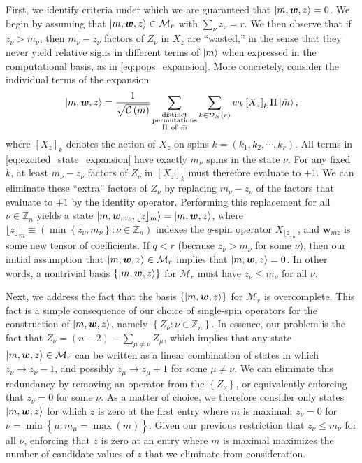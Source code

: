 \documentclass[nofootinbib,notitlepage,11pt]{revtex4-2}
\renewcommand{\t}{\text} %
\newcommand{\f}[2]{\dfrac{#1}{#2}} %
\newcommand{\p}[1]{\left(#1\right)} %
\renewcommand{\sp}[1]{\left[#1\right]} %
\renewcommand{\set}[1]{\left\{#1\right\}} %
\newcommand{\m}{\bm} %
\newcommand{\1}{\mathds{1}}
\newcommand{\C}{\mathcal{C}}
\newcommand{\D}{\mathcal{D}}
\newcommand{\M}{\mathcal{M}}
\newcommand{\ZZ}{\mathbb{Z}}
\newcommand{\floor}[1]{\lfloor{#1}\rfloor}
\begin{document}
First, we identify criteria under which we are guaranteed that
$\ket{m,\m w,z}=0$.  We begin by assuming that $\ket{m,\m w,z}\in\M_r$
with $\sum_\nu z_\nu=r$.  We then observe that if $z_\nu>m_\nu$, then
$m_\nu-z_\nu$ factors of $Z_\nu$ in $X_z$ are ``wasted,'' in the sense
that they never yield relative signs in different terms of $\ket{m}$
when expressed in the computational basis, as in
\eqref{eq:pops_expansion}.  More concretely, consider the individual
terms of the expansion
\begin{align}
  \ket{m,\m w,z}
  = \f1{\sqrt{\C\p{m}}}
  \sum_{\substack{\t{distinct}\\\t{permutations}\\\Pi~\t{of}~\tilde m}}
  \sum_{k\in\D_N\p{r}} w_k \sp{X_z}_k \Pi \ket{\tilde m},
  \label{eq:excited_state_expansion}
\end{align}
where $\sp{X_z}_k$ denotes the action of $X_z$ on spins
$k=\p{k_1,k_2,\cdots,k_r}$.  All terms in
\eqref{eq:excited_state_expansion} have exactly $m_\nu$ spins in the
state $\nu$.  For any fixed $k$, at least $m_\nu-z_\nu$ factors of
$Z_\nu$ in $\sp{X_z}_k$ must therefore evaluate to $+1$.  We can
eliminate these ``extra'' factors of $Z_\nu$ by replacing
$m_\nu-z_\nu$ of the factors that evaluate to $+1$ by the identity
operator.  Performing this replacement for all $\nu\in\ZZ_n$ yields a
state $\ket{m,\m w_{mz},{\floor{z}_m}}=\ket{m,\m w,z}$, where
$\floor{z}_m\equiv\p{\min\set{z_\nu,m_\nu}:\nu\in\ZZ_n}$ indexes the
$q$-spin operator $X_{\floor{z}_m}$, and $\m w_{mz}$ is some new
tensor of coefficients.  If $q<r$ (because $z_\nu>m_\nu$ for some
$\nu$), then our initial assumption that $\ket{m,\m w,z}\in\M_r$
implies that $\ket{m,\m w,z}=0$.  In other words, a nontrivial basis
$\set{\ket{m,\m w,z}}$ for $\M_r$ must have $z_\nu\le m_\nu$ for all
$\nu$.

Next, we address the fact that the basis $\set{\ket{m,\m w,z}}$ for
$\M_r$ is overcomplete.  This fact is a simple consequence of our
choice of single-spin operators for the construction of
$\ket{m,\m w,z}$, namely $\set{Z_\nu:\nu\in\ZZ_n}$.  In essence, our
problem is the fact that $Z_\nu=\p{n-2}-\sum_{\mu\ne\nu}Z_\mu$, which
implies that any state $\ket{m,\m w,z}\in\M_r$ can be written as a
linear combination of states in which $z_\nu\to z_\nu-1$, and possibly
$z_\mu\to z_\mu+1$ for some $\mu\ne\nu$.  We can eliminate this
redundancy by removing an operator from the $\set{Z_\nu}$, or
equivalently enforcing that $z_\nu=0$ for some $\nu$.  As a matter of
choice, we therefore consider only states $\ket{m,\m w,z}$ for which
$z$ is zero at the first entry where $m$ is maximal: $z_\nu=0$ for
$\nu=\min\set{\mu:m_\mu=\max\p{m}}$.  Given our previous restriction
that $z_\nu\le m_\nu$ for all $\nu$, enforcing that $z$ is zero at an
entry where $m$ is maximal maximizes the number of candidate values of
$z$ that we eliminate from consideration.
\end{document}
